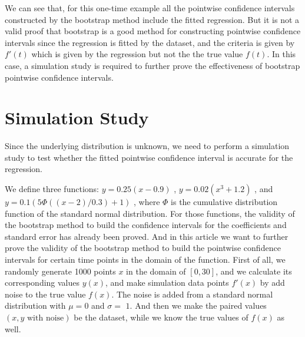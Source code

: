 \documentclass[12pt]{article}
\begin{document}
We can see that, for this one-time example all the pointwise confidence intervals 
constructed by the bootstrap method include the fitted regression. But it is not a
valid proof that bootstrap is a good method for constructing pointwise confidence 
intervals since the regression is fitted by the dataset, and the criteria is given
by \(f'(t)\) which is given by the regression but not the the true value \(f(t)\).
In this case, a simulation study is required to further prove the effectiveness of 
bootstrap pointwise confidence intervals.









\section{Simulation Study}
\label{Simulation Study}


Since the underlying distribution is unknown, we need to perform a simulation
study to test whether the fitted pointwise confidence interval is accurate 
for the regression.


We define three functions: \(y = 0.25(x - 0.9)\) , \(y = 0.02(x^3+1.2)\) , and
\( y = 0.1 (5\Phi((x - 2) / 0.3) + 1)\) , where \(\Phi\) is the cumulative 
distribution function of the standard normal distribution. For those functions,
the validity of the bootstrap method to build the confidence intervals for the
coefficients and standard error has already been proved. 
\cite{jieying2022heteroscedastic} And in this article we want to further prove
the validity of the bootstrap method to build the pointwise confidence intervals
for certain time points in the domain of the function. First of all, we randomly
generate 1000 points \(x\) in the domain of \([0,30]\), and we calculate its 
corresponding values \(y(x)\), and make simulation data points \(f'(x)\) by add 
noise to the true value \(f(x)\). The noise is added from a standard normal 
distribution with \(\mu = 0\) and \(\sigma = \) \(1\). And then we make the 
paired values \((x, y\text{ with noise})\) be the dataset, while we know the 
true values of \(f(x)\) as well. 
\end{document}
